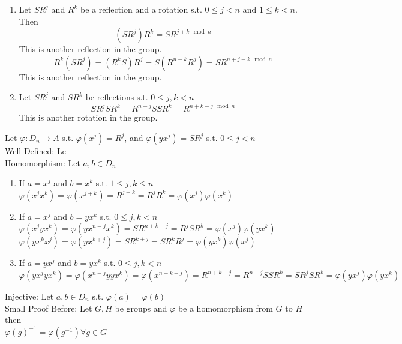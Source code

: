 \documentclass[12pt, letterpaper]{article}
\theoremstyle{definition}
\begin{document}
\begin{itemize}
\begin{enumerate}
\[            = \begin{pmatrix}
                \cos\left(\frac{360^\circ j+k}{n}\right) & -\sin\left(\frac{360^\circ j+k}{n}\right) \\
                \sin\left(\frac{360^\circ j+k}{n}\right) & \cos\left(\frac{360^\circ j+k }{n}\right)
                \end{pmatrix}
        \]
        This is another rotation matrix specifically $R^{j+k \mod n}$
        \item Let $SR^j$ and $R^k$ be a reflection and a rotation s.t. $0 \leq j < n$ and $1 \leq k < n$. Then
        \[(SR^j)R^k=SR^{j+k \mod n}\] This is another reflection in the group.
        \[R^k(SR^j)=(R^kS)R^j=S(R^{n-k}R^j)=SR^{n+j-k \mod n}\] This is another reflection in the group.
        \item Let $SR^j$ and $SR^k$ be reflections s.t. $0 \leq j,k < n$
        \[SR^jSR^k=R^{n-j}SSR^k=R^{n+k-j \mod n}\] This is another rotation in the group.
    \end{enumerate}
\end{itemize}
Let $\varphi : D_n \mapsto A$ s.t. $\varphi(x^j)=R^j$, and $\varphi(yx^j)=SR^j$ s.t. $0 \leq j < n$\\
Well Defined: Le\\
Homomorphism: Let $a,b \in D_n$
\begin{enumerate}
    \item If $a=x^j$ and $b=x^k$ s.t. $1 \leq j,k \leq n$\\
    $\varphi(x^jx^k)=\varphi(x^{j+k})=R^{j+k}=R^jR^k=\varphi(x^j)\varphi(x^k)$
    \item If $a=x^j$ and $b=yx^k$ s.t. $0 \leq j,k < n$\\
    $\varphi(x^jyx^k)=\varphi(yx^{n-j}x^k)=SR^{n+k-j}=R^jSR^{k}=\varphi(x^j)\varphi(yx^k)$\\
    $\varphi(yx^kx^j)=\varphi(yx^{k+j})=SR^{k+j}=SR^kR^{j}=\varphi(yx^k)\varphi(x^j)$\\
    \item If $a=yx^j$ and $b=yx^k$ s.t. $0 \leq j,k < n$\\
    $\varphi(yx^jyx^k)=\varphi(x^{n-j}yyx^k)=\varphi(x^{n+k-j})=R^{n+k-j}=R^{n-j}SSR^{k}=SR^jSR^k=\varphi(yx^j)\varphi(yx^k)$
\end{enumerate}
Injective: Let $a,b \in D_n$ s.t. $\varphi(a)=\varphi(b)$\\
Small Proof Before:
Let $G,H$ be groups and $\varphi$ be a homomorphism from $G$ to $H$ then\\
$\varphi(g)^{-1}=\varphi(g^{-1}) \forall g\in G$
\end{document}
